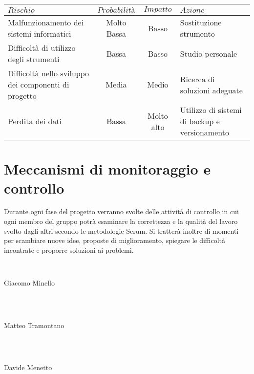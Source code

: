 \documentclass[paper=a4, fontsize=11pt]{scrartcl}
\numberwithin{equation}{section}		%
\numberwithin{figure}{section}			%
\numberwithin{table}{section}				%
\begin{document}
	\begin{table}[H]
    \centering
    \begin{tabular}{p{5cm} c c p{5cm} } \toprule
    {$Rischio$}  & {$Probabilità$} & {$Impatto$} & {$Azione$}\\ \midrule
    Malfunzionamento dei sistemi informatici & Molto Bassa & Basso & Sostituzione strumento \\
    Difficoltà di utilizzo degli strumenti & Bassa & Basso & Studio personale \\
    Difficoltà nello sviluppo dei componenti di progetto & Media & Medio & Ricerca di soluzioni adeguate\\
    Perdita dei dati & Bassa & Molto alto & Utilizzo di sistemi di backup e versionamento \\
     \bottomrule
     \end{tabular}
    \end{table}

\section{Meccanismi di monitoraggio e controllo}
Durante ogni fase del progetto verranno svolte delle attività di controllo in cui ogni membro del gruppo potrà
esaminare la correttezza e la qualità del lavoro svolto dagli altri secondo le metodologie Scrum. Si tratterà inoltre di momenti per
scambiare nuove idee, proposte di miglioramento, spiegare le difficoltà incontrate e proporre soluzioni ai
problemi. 


\\
\begin{flushright}
Giacomo Minello
\end{flushright}
\\~\\
\begin{flushright}
Matteo Tramontano
\end{flushright}
\\~\\
\begin{flushright}
Davide Menetto
\end{flushright}
\end{document}
